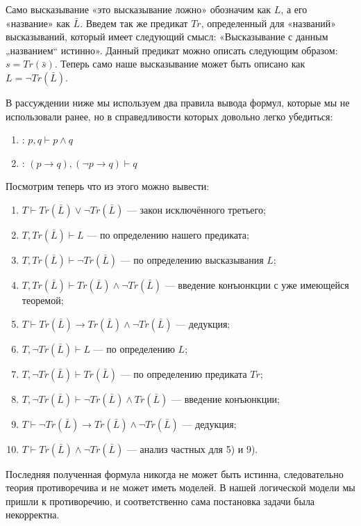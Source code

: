 Само высказывание «это высказывание ложно» обозначим как $L$, а его «название» как $\bar{L}$. Введем так же предикат $Tr$, определенный для «названий» высказываний, который имеет следующий смысл: «Высказывание с данным „названием“ истинно». Данный предикат можно описать следующим образом: $s = Tr(\bar{s})$. Теперь само наше высказывание может быть описано как $L = \neg Tr(\bar{L})$.

В рассуждении ниже мы используем два правила вывода формул, которые мы не использовали ранее, но в справедливости которых довольно легко убедиться:

\begin{enumerate}
\item {}: $p, q\vdash p\land q$
\item {}: $(p\to q), (\neg p\to q)\vdash q$
\end{enumerate}

Посмотрим теперь что из этого можно вывести:

\begin{enumerate}
\item  $T\vdash Tr(\bar{L})\vee\neg Tr(\bar{L})$ — закон исключённого третьего;
\item  $T, Tr(\bar{L})\vdash L$ — по определению нашего предиката;
\item  $T, Tr(\bar{L})\vdash \neg Tr(\bar{L})$ — по определению высказывания $L$;
\item  $T, Tr(\bar{L})\vdash Tr(\bar{L})\wedge\neg Tr(\bar{L})$ — введение конъюнкции с уже имеющейся теоремой;
\item  $T\vdash Tr(\bar{L})\rightarrow Tr(\bar{L})\wedge\neg Tr(\bar{L})$ — дедукция;
\item  $T, \neg Tr(\bar{L})\vdash L$ — по определению $L$;
\item  $T, \neg Tr(\bar{L}) \vdash Tr(\bar{L})$ — по определению предиката $Tr$;
\item  $T, \neg Tr(\bar{L})\vdash \neg Tr(\bar{L}) \wedge Tr(\bar{L})$ — введение конъюнкции;
\item  $T\vdash \neg Tr(\bar{L})\rightarrow Tr(\bar{L})\wedge\neg Tr(\bar{L})$ — дедукция;
\item  $T\vdash Tr(\bar{L})\wedge\neg Tr(\bar{L})$ — анализ частных для 5) и 9).
\end{enumerate}

Последняя полученная формула никогда не может быть истинна, следовательно теория противоречива и не может иметь моделей. В нашей логической модели мы пришли к противоречию, и соответственно сама постановка задачи была некорректна.


